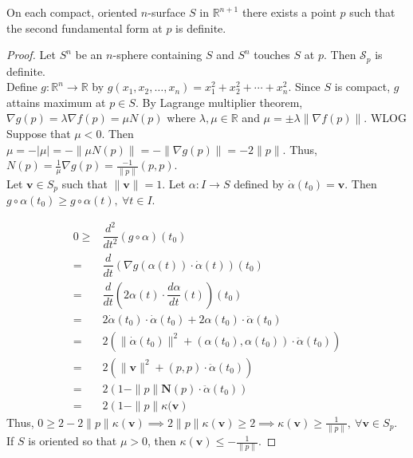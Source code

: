 \begin{theorem}
	On each compact, oriented $n$-surface $S$ in $\mathbb{R}^{n+1}$ there exists a point $p$ such that the second fundamental form at $p$ is definite.
\end{theorem}
\begin{proof}
	Let $S^n$ be an $n$-sphere containing $S$ and $S^n$ touches $S$ at $p$.
	Then $\mathscr{S}_p$ is definite.\\


	Define $g : \mathbb{R}^n \to \mathbb{R}$ by $g(x_1,x_2,\dots, x_n) = x_1^2 + x_2^2 + \dotsb + x_n^2$.
	Since $S$ is compact, $g$ attains maximum at $p \in S$.
	By Lagrange multiplier theorem, $\nabla g(p) = \lambda \nabla f(p) = \mu N(p)$ where $\lambda,\mu \in \mathbb{R}$ and $\mu = \pm \lambda \|\nabla f(p) \|$.
	WLOG Suppose that $\mu < 0$.
	Then $\mu = -|\mu| = -\|\mu N(p) \| = -\| \nabla g(p) \| = -2\|p\|$.
	Thus, $N(p) = \frac{1}{\mu} \nabla g(p) = \frac{-1}{\| p \|} (p,p)$. \\


	Let $\boldsymbol{v} \in S_p$ such that $\| \boldsymbol{v} \| = 1$.
	Let $\alpha : I \to S$ defined by $\dot{\alpha}(t_0) = \boldsymbol{v}$.
	Then $g \circ \alpha(t_0) \ge g \circ \alpha(t),\ \forall t \in I$.

\begingroup
\allowdisplaybreaks
	\begin{align*}
		0 \ge & \dfrac{d^2}{dt^2} \left( g \circ \alpha \right)(t_0) \\
		= & \dfrac{d}{dt} \left( \nabla g(\alpha(t)) \cdot \dot{\alpha}(t) \right)(t_0) \\
		= & \dfrac{d}{dt} \left( 2\alpha(t) \cdot \dfrac{d\alpha}{dt} (t) \right)(t_0) \\
		= & 2\dot{\alpha}(t_0) \cdot \dot{\alpha}(t_0) + 2 \alpha(t_0) \cdot \ddot{\alpha}(t_0)\\
		= & 2 \left( \| \dot{\alpha}(t_0)\|^2 + (\alpha(t_0),\alpha(t_0)) \cdot \ddot{\alpha}(t_0) \right) \\
		= & 2 \left( \| \boldsymbol{v} \|^2 + (p,p) \cdot \ddot{\alpha}(t_0) \right)\\
		= & 2\left( 1-\|p\|\boldsymbol{N}(p) \cdot \ddot{\alpha}(t_0) \right)\\
		= & 2\left( 1-\|p\| \kappa(\boldsymbol{v} \right)
	\end{align*}
\endgroup
	Thus, $0 \ge 2-2\|p\|\kappa(\boldsymbol{v}) \implies 2\|p\|\kappa(\boldsymbol{v}) \ge 2 \implies \kappa(\boldsymbol{v}) \ge \frac{1}{\|p\|},\ \forall \boldsymbol{v} \in S_p$.
	If $S$ is oriented so that $\mu > 0$, then $\kappa(\boldsymbol{v}) \le -\frac{1}{\|p\|}$.
\end{proof}

